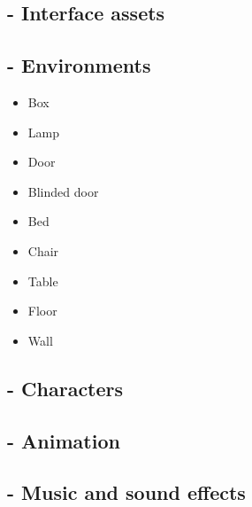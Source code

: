 \subsection{- Interface assets}
\subsection{- Environments}
\begin{itemize}  
 			\item Box
			\item Lamp
			\item Door
			\item Blinded door
      \item Bed
			\item Chair
			\item Table
			\item Floor
      \item Wall
      	\end{itemize}
        
\subsection{- Characters}
\subsection{- Animation}
\subsection{- Music and sound effects}
